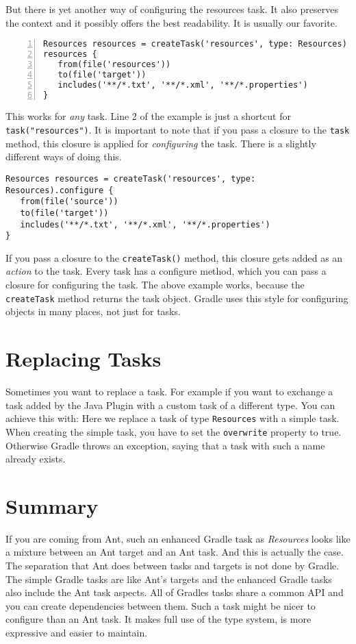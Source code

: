 But there is yet another way of configuring the resources task. It also preserves the context and it possibly offers the best readability. It is usually our favorite.
\begin{Verbatim}[numbers=left]
Resources resources = createTask('resources', type: Resources)
resources {
   from(file('resources'))
   to(file('target'))
   includes('**/*.txt', '**/*.xml', '**/*.properties')
}
\end{Verbatim}
This works for \emph{any} task. Line 2 of the example is just a shortcut for \texttt{task("resources")}. It is important to note that if you pass a closure to the \texttt{task} method, this closure is applied for \emph{configuring} the task. There is a slightly different ways of doing this.
\begin{Verbatim}
Resources resources = createTask('resources', type: Resources).configure {
   from(file('source'))
   to(file('target'))
   includes('**/*.txt', '**/*.xml', '**/*.properties')
}	
\end{Verbatim}
If you pass a closure to the \texttt{createTask()} method, this closure gets added as an \emph{action} to the task. Every task has a configure method, which you can pass a closure for configuring the task. The above example works, because the \texttt{createTask} method returns the task object. Gradle uses this style for configuring objects in many places, not just for tasks.

\section{Replacing Tasks}
Sometimes you want to replace a task. For example if you want to exchange a task added by the Java Plugin with a custom task of a different type. You can achieve this with:
Here we replace a task of type \texttt{Resources} with a simple task. When creating the simple task, you have to set the \texttt{overwrite} property to true. Otherwise Gradle throws an exception, saying that a task with such a name already exists.

\section{Summary} %
\label{sec:the_idea_behind_gradle_tasks}
If you are coming from Ant, such an enhanced Gradle task as \emph{Resources} looks like a mixture between an Ant target and an Ant task. And this is actually the case. The separation that Ant does between tasks and targets is not done by Gradle. The simple Gradle tasks are like Ant's targets and the enhanced Gradle tasks also include the Ant task aspects. All of Gradles tasks share a common API and you can create dependencies between them. Such a task might be nicer to configure than an Ant task. It makes full use of the type system, is more expressive and easier to maintain.

